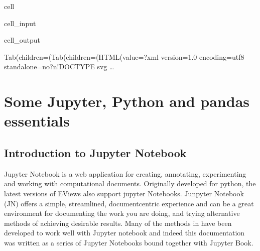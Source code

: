 \documentclass[letterpaper,10pt,english]{jupyterBook}
\begin{document}
\begin{sphinxuseclass}{cell}\begin{sphinxVerbatimInput}

\begin{sphinxuseclass}{cell_input}
\begin{sphinxVerbatim}[commandchars=\\\{\}]
\PYG{p}{[}\PYG{p}{]}
\end{sphinxVerbatim}

\end{sphinxuseclass}\end{sphinxVerbatimInput}
\begin{sphinxVerbatimOutput}

\begin{sphinxuseclass}{cell_output}
\begin{sphinxVerbatim}[commandchars=\\\{\}]
Tab(children=(Tab(children=(HTML(value=\PYGZsq{}\PYGZlt{}?xml version=\PYGZdq{}1.0\PYGZdq{} encoding=\PYGZdq{}utf\PYGZhy{}8\PYGZdq{} standalone=\PYGZdq{}no\PYGZdq{}?\PYGZgt{}\PYGZbs{}n\PYGZlt{}!DOCTYPE svg …
\end{sphinxVerbatim}

\begin{sphinxVerbatim}[commandchars=\\\{\}]

\end{sphinxVerbatim}

\end{sphinxuseclass}\end{sphinxVerbatimOutput}

\end{sphinxuseclass}
\sphinxstepscope


\part{Some Jupyter, Python and pandas essentials}

\sphinxstepscope


\chapter{Introduction to  Jupyter Notebook}
\label{\detokenize{content/04_PythonEssentials/Intro_Jupyter_notebook:introduction-to-jupyter-notebook}}\label{\detokenize{content/04_PythonEssentials/Intro_Jupyter_notebook::doc}}
\sphinxAtStartPar
Jupyter Notebook is a web application for creating, annotating, experimenting and working with computational documents.  Originally developed for python, the latest versions of EViews also support jupyter Notebooks. Junpyter Notebook (JN) offers a simple, streamlined, document\sphinxhyphen{}centric experience and can be a great environment for documenting the work you are doing, and trying alternative methods of achieving desirable results.  Many of the methods in  have been developed to work well with Jupyter notebook and indeed this documentation was written as a series of Jupyter Notebooks bound together with Jupyter Book.
\end{document}
